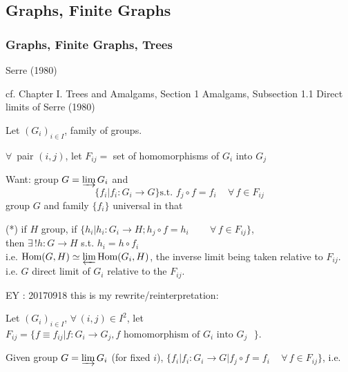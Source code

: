 \documentclass[10pt]{amsart}
\begin{document}
\begin{multicols*}{2}
\part{Graphs, Finite Graphs}

\section{Graphs, Finite Graphs, Trees }

Serre (1980) \cite{Serr1980}  

cf. Chapter I. Trees and Amalgams, Section 1 Amalgams, Subsection 1.1 Direct limits of Serre (1980) \cite{Serr1980}  


Let $(G_i)_{i\in I}$, family of groups.    

$\forall \, $ pair $(i,j)$, let $F_{ij} = $ set of homomorphisms of $G_i$ into $G_j$

Want: group $G= \varinjlim G_i$ and 
\[
\lbrace f_i | f_i : G_i \to G \rbrace \text{s.t. } f_j \circ f = f_i \quad \, \forall \, f \in F_{ij}
\]
group $G$ and family $\lbrace f_i\rbrace$ universal in that  

(*) if $H$ group, if $\lbrace h_i | h_i :G_i \to H ; h_j \circ f = h_i \qquad \, \forall \, f \in F_{ij} \rbrace$, \\
then $\exists \, ! h: G\to H$ s.t. $h_i = h\circ f_i$  \\
i.e. $\text{Hom}(G,H) \simeq \varprojlim \text{Hom}(G_i,H)$, the inverse limit being taken relative to $F_{ij}$.  \\
i.e. $G$ direct limit of $G_i$ relative to the $F_{ij}$.  

EY : 20170918 this is my rewrite/reinterpretation:

Let $(G_i)_{i\in I}$, $\forall \, (i,j) \in I^2$, let $F_{ij} = \lbrace f \equiv f_{ij} | f:G_i \to G_j , f \text{ homomorphism of $G_i$ into $G_j$ } \rbrace$.  

Given group $G = \varinjlim G_i$ (for fixed $i$), $\lbrace f_i | f_i : G_i \to G  |  f_j \circ f = f_i \quad \, \forall \, f \in F_{ij} \rbrace$, i.e.  



\end{multicols*}
\end{document}
